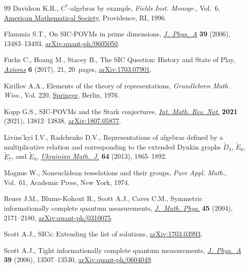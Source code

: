 \documentclass[pdftex]{sigma}
\numberwithin{equation}{section}
\begin{document}
\begin{thebibliography}{99}
Davidson K.R., {$C^*$}-algebras by example, \textit{Fields Inst. Monogr.},
 Vol.~6, \href{https://doi.org/10.1090/fim/006}{American Mathematical Society}, Providence, RI, 1996.

Flammia S.T., On {SIC}-{POVM}s in prime dimensions, \href{https://doi.org/10.1088/0305-4470/39/43/007}{\textit{J.~Phys.~A}}
 \textbf{39} (2006), 13483--13493, \href{https://arxiv.org/abs/quant-ph/0605050}{arXiv:quant-ph/0605050}.

Fuchs C., Hoang M., Stacey B., The SIC Question: History and State of Play,
 \href{https://doi.org/10.3390/axioms6030021}{\textit{Axioms}} \textbf{6} (2017), 21, 20~pages, \href{https://arxiv.org/abs/1703.07901}{arXiv:1703.07901}.

Kirillov A.A., Elements of the theory of representations, \textit{Grundlehren
 Math. Wiss.}, Vol. 220, \href{https://doi.org/10.1007/978-3-642-66243-0}{Springer}, Berlin, 1976.

Kopp G.S., S{IC}-{POVM}s and the {S}tark conjectures, \href{https://doi.org/10.1093/imrn/rnz153}{\textit{Int. Math. Res.
 Not.}} \textbf{2021} (2021), 13812--13838, \href{https://arxiv.org/abs/1807.05877}{arXiv:1807.05877}.

Livins'kyi I.V., Radchenko D.V., Representations of algebras defined by a
 multiplicative relation and corresponding to the extended {D}ynkin graphs
 {$\tilde{D}_4$}, {$\tilde{E}_6$}, {$\tilde{E}_7$}, and {$\tilde{E}_8$},
 \href{https://doi.org/10.1007/s11253-013-0757-y}{\textit{Ukrainian Math.~J.}} \textbf{64} (2013), 1865--1892.

Magnus W., Noneuclidean tesselations and their groups, \textit{Pure Appl.
 Math.}, Vol.~61, Academic Press, New York, 1974.

Renes J.M., Blume-Kohout R., Scott A.J., Caves C.M., Symmetric informationally
 complete quantum measurements, \href{https://doi.org/10.1063/1.1737053}{\textit{J.~Math. Phys.}} \textbf{45} (2004),
 2171--2180, \href{https://arxiv.org/abs/quant-ph/0310075}{arXiv:quant-ph/0310075}.

Scott A.J., {SIC}s: {E}xtending the list of solutions, \href{https://arxiv.org/abs/1703.03993}{arXiv:1703.03993}.

Scott A.J., Tight informationally complete quantum measurements,
  \href{https://doi.org/10.1088/0305-4470/39/43/009}{\textit{J.~Phys.~A}} \textbf{39} (2006), 13507--13530,
 \href{https://arxiv.org/abs/quant-ph/0604049}{arXiv:quant-ph/0604049}.


\end{thebibliography}
\end{document}
